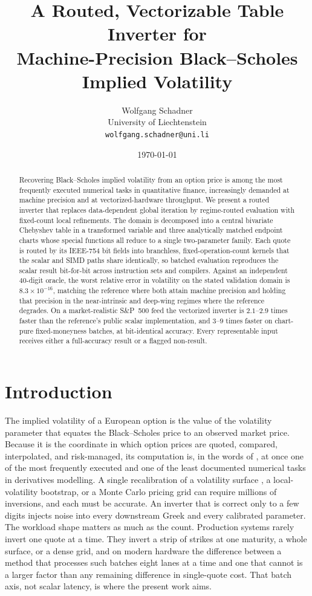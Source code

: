 \documentclass[11pt]{article}
\title{A Routed, Vectorizable Table Inverter for\\ Machine-Precision Black--Scholes Implied Volatility}
\author{}        %
\date{}
\author{Wolfgang Schadner\\[2pt]
    University of Liechtenstein\\[1pt]
    \texttt{wolfgang.schadner@uni.li}}
\date{\today}
\begin{document}
\maketitle

\begin{abstract}
Recovering Black--Scholes implied volatility from an option price is among the most frequently executed numerical tasks in quantitative finance, increasingly demanded at machine precision and at vectorized-hardware throughput. We present a routed inverter that replaces data-dependent global iteration by regime-routed evaluation with fixed-count local refinements. The domain is decomposed into a central bivariate Chebyshev table in a transformed variable and three analytically matched endpoint charts whose special functions all reduce to a single two-parameter family. Each quote is routed by its IEEE-754 bit fields into branchless, fixed-operation-count kernels that the scalar and SIMD paths share identically, so batched evaluation reproduces the scalar result bit-for-bit across instruction sets and compilers. Against an independent 40-digit oracle, the worst relative error in volatility on the stated validation domain is $8.3\times10^{-16}$, matching the reference where both attain machine precision and holding that precision in the near-intrinsic and deep-wing regimes where the reference degrades. On a market-realistic S\&P~500 feed the vectorized inverter is $2.1$--$2.9$ times faster than the reference's public scalar implementation, and $3$--$9$ times faster on chart-pure fixed-moneyness batches, at bit-identical accuracy. Every representable input receives either a full-accuracy result or a flagged non-result.
\end{abstract}

\section{Introduction}
\label{sec:intro}

The implied volatility of a European option is the value of the volatility parameter that equates the Black--Scholes price to an observed market price. Because it is the coordinate in which option prices are quoted, compared, interpolated, and risk-managed, its computation is, in the words of \citet{jackel2006implication}, at once one of the most frequently executed and one of the least documented numerical tasks in derivatives modelling. A single recalibration of a volatility surface \citep{gatheral2006surface}, a local-volatility bootstrap, or a Monte Carlo pricing grid can require millions of inversions, and each must be accurate. An inverter that is correct only to a few digits injects noise into every downstream Greek and every calibrated parameter. The workload shape matters as much as the count. Production systems rarely invert one quote at a time. They invert a strip of strikes at one maturity, a whole surface, or a dense grid, and on modern hardware the difference between a method that processes such batches eight lanes at a time and one that cannot is a larger factor than any remaining difference in single-quote cost. That batch axis, not scalar latency, is where the present work aims.
\end{document}
